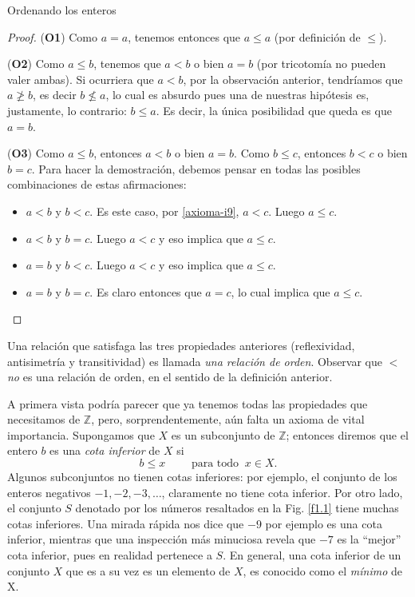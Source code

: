 \begin{section}{Ordenando los enteros}
\begin{ejemplo}
\begin{proof}
(\textbf{O1}) Como $a=a$, tenemos entonces que $a \le a$ (por definición de $\le$).


(\textbf{O2}) Como $a \le b$, tenemos que $a<b$ o bien $a=b$ (por tricotomía no pueden valer ambas). Si ocurriera que $a<b$, por la observación anterior, tendríamos que $a\not\ge b$, es decir $b\not\le a$, lo cual es absurdo pues una de nuestras hipótesis es,  justamente, lo contrario:  $b \le a$.  Es decir, la única posibilidad que queda es que $a=b$.     

(\textbf{O3}) Como $a\le b$, entonces $a <b$ o bien $a=b$. Como $b\le c$, entonces $b<c$ o bien $b=c$. Para hacer la demostración, debemos pensar en todas las posibles combinaciones de estas afirmaciones:
\begin{itemize}
    \item $a<b$ y $b<c$. Es este caso, por  \ref{axioma-i9}, $a<c$. Luego $a\le c$.
    
    \item $a<b$ y $b=c$. Luego $a<c$ y eso implica que $a\le c$.
    
    \item $a=b$ y $b<c$. Luego $a<c$ y eso implica que $a\le c$.
    
    \item $a=b$ y $b=c$. Es claro entonces que $a=c$, lo cual implica que $a\le c$.
\end{itemize}    
\end{proof}
\end{ejemplo}

Una relación que satisfaga las tres propiedades anteriores (reflexividad, antisimetría y transitividad) es llamada {\em una relación de orden}. Observar que $<$ {\em no} es una relación de orden, en el sentido de la definición anterior. 

A primera vista podría parecer que ya tenemos todas las propiedades que necesitamos de $\mathbb Z$, pero, sorprendentemente, aún falta un axioma de vital importancia. Supongamos que $X$ es un subconjunto de $\mathbb Z$; entonces diremos que el entero $b$ es una {\em cota inferior} de $X$ si
$$
b\le x \qquad \text{ para todo } \ x \in X.
$$
Algunos subconjuntos no tienen cotas inferiores: por ejemplo, el conjunto de los enteros negativos $-1, -2, -3, \ldots$, claramente no tiene cota inferior. Por otro lado, el conjunto $S$ denotado por los números resaltados en la Fig. \ref{f1.1} tiene muchas cotas inferiores. Una mirada rápida nos dice que $-9$ por ejemplo es una cota inferior, mientras que una inspección más minuciosa revela que $-7$ es la ``mejor'' cota inferior, pues en realidad pertenece a $S$. En general, una cota inferior de un conjunto $X$ que es a su vez es un elemento de $X$, es conocido como el {\em mínimo} de X.


\end{section}
